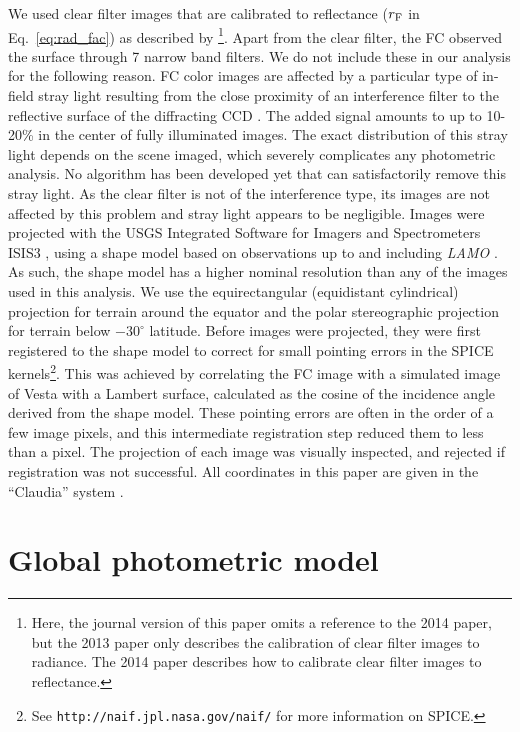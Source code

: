 \documentclass[3p,authoryear]{elsarticle}
\begin{document}
We used clear filter images that are calibrated to reflectance ($r_{\rm F}$ in Eq.~\ref{eq:rad_fac}) as described by \citet{S13,S14}\footnote{Here, the journal version of this paper omits a reference to the 2014 paper, but the 2013 paper only describes the calibration of clear filter images to radiance. The 2014 paper describes how to calibrate clear filter images to reflectance.}. Apart from the clear filter, the FC observed the surface through 7 narrow band filters. We do not include these in our analysis for the following reason. FC color images are affected by a particular type of in-field stray light resulting from the close proximity of an interference filter to the reflective surface of the diffracting CCD \citep{Si11}. The added signal amounts to up to 10-20\% in the center of fully illuminated images. The exact distribution of this stray light depends on the scene imaged, which severely complicates any photometric analysis. No algorithm has been developed yet that can satisfactorily remove this stray light. As the clear filter is not of the interference type, its images are not affected by this problem and stray light appears to be negligible. Images were projected with the USGS Integrated Software for Imagers and Spectrometers ISIS3 \citep{A04,B12}, using a shape model based on observations up to and including {\it LAMO} \citep{G11}. As such, the shape model has a higher nominal resolution than any of the images used in this analysis. We use the equirectangular (equidistant cylindrical) projection for terrain around the equator and the polar stereographic projection for terrain below $-30^\circ$ latitude. Before images were projected, they were first registered to the shape model to correct for small pointing errors in the SPICE kernels\footnote{See \texttt{http://naif.jpl.nasa.gov/naif/} for more information on SPICE.}. This was achieved by correlating the FC image with a simulated image of Vesta with a Lambert surface, calculated as the cosine of the incidence angle derived from the shape model. These pointing errors are often in the order of a few image pixels, and this intermediate registration step reduced them to less than a pixel. The projection of each image was visually inspected, and rejected if registration was not successful. All coordinates in this paper are given in the ``Claudia'' system \citep{R12}.


\section{Global photometric model}
\label{sec:global_model}
\end{document}
